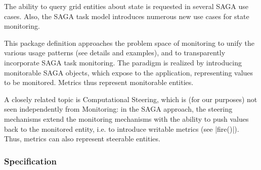  
  The ability to query grid entities about state is
  requested in several SAGA use cases.  Also, the SAGA task
  model introduces numerous new use cases for state monitoring.
 
  This package definition approaches the problem space of
  monitoring to unify the various usage patterns (see details
  and examples), and to transparently incorporate SAGA task
  monitoring.  The paradigm is realized by introducing
  monitorable SAGA objects, which expose  to
  the application, representing values to be monitored.
  Metrics thus represent monitorable entities.
 
  A closely related topic is Computational Steering, which is
  (for our purposes) not seen independently from Monitoring: in
  the SAGA approach, the steering mechanisms extend the
  monitoring mechanisms with the ability to push values
  back to the monitored entity, i.e. to introduce writable
  metrics (see |fire()|).  Thus, metrics can also
  represent steerable entities.
 
 
 \subsubsection{Specification}
 
